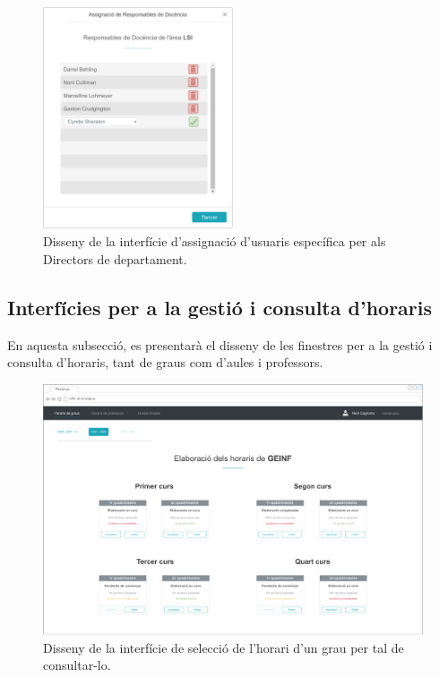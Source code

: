 \documentclass[a4paper,12pt]{ThesisStyle}
\begin{document}
\begin{figure}[H]
	\centering
	\includegraphics[width=0.5\textwidth]{assets/interfaces/directors/gestResp/assignDialog.pdf}
	\caption{\label{img:gestResp_assignDialog}Disseny de la interfície d'assignació d'usuaris específica per als Directors de departament.}
\end{figure}

\subsection{Interfícies per a la gestió i consulta d'horaris}
\label{subsec:interficies_consulta_gestio_horaris}

En aquesta subsecció, es presentarà el disseny de les finestres per a la gestió i consulta d'horaris, tant de graus com d'aules i professors.

\begin{figure}[H]
	\centering
	\includegraphics[width=\textwidth]{assets/interfaces/coordinadors/horarisGraus/selHorari.pdf}
	\caption{\label{img:horarisGraus_selHorari}Disseny de la interfície de selecció de l'horari d'un grau per tal de consultar-lo.}
\end{figure}
\end{document}
